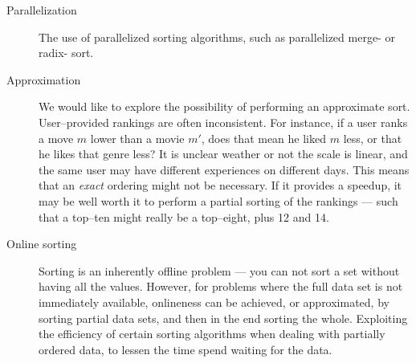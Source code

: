 \documentclass[a4paper, titlepage]{report}
\renewcommand{\%}{\scalebox{.9}{\oldpct}}
\begin{document}
\begin{description}
	\item[Parallelization] The use of parallelized sorting algorithms, such
		as parallelized merge- or radix- sort.

	\item[Approximation] We would like to explore the possibility of
		performing an approximate sort. User--provided rankings are
		often inconsistent. For instance, if a user ranks a move $m$
		lower than a movie $m'$, does that mean he liked $m$ less, or
		that he likes that genre less? It is unclear weather or not the
		scale is linear, and the same user may have different
		experiences on different days. This means that an \textit{exact}
		ordering might not be necessary. If it provides a speedup, it
		may be well worth it to perform a partial sorting of the
		rankings --- such that a top--ten might really be a top--eight,
		plus 12 and 14.

	\item[Online sorting] Sorting is an inherently offline problem --- you
		can not sort a set without having all the values. However, for
		problems where the full data set is not immediately available,
		onlineness can be achieved, or approximated, by sorting partial
		data sets, and then in the end sorting the whole. Exploiting the
		efficiency of certain sorting algorithms when dealing with
		partially ordered data, to lessen the time spend waiting for the
		data.

\end{description}




\end{document}
